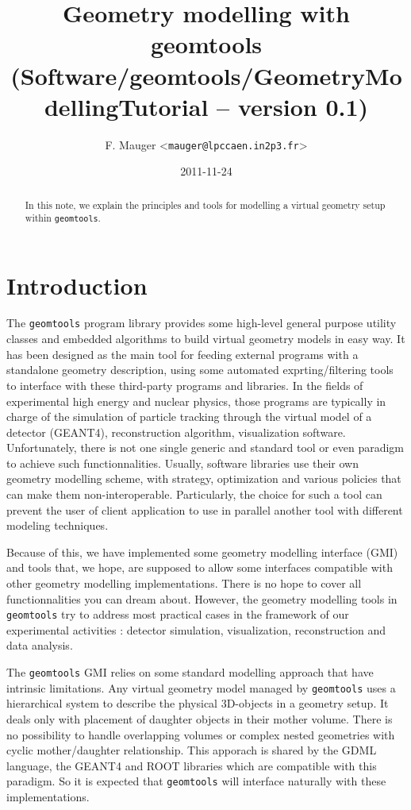 \documentclass[a4paper,12pt]{article}
\title{Geometry modelling with geomtools\\%
{\small{(Software/geomtools/GeometryModellingTutorial -- version 0.1)}}}
\author{F. Mauger <\texttt{mauger@lpccaen.in2p3.fr}>}
\date{2011-11-24}
\newcommand{\pn}{\par\noindent}
\begin{document}
\maketitle

\begin{abstract}
In this note, we explain the principles and tools
for modelling a virtual geometry setup within \texttt{geomtools}.
\end{abstract}

\section{Introduction}

\pn  The \texttt{geomtools} program  library provides  some high-level
general  purpose  utility classes  and  embedded  algorithms to  build
virtual geometry models in easy way.  It has been designed as the main
tool  for  feeding  external   programs  with  a  standalone  geometry
description,   using  some   automated  exprting/filtering   tools  to
interface with these third-party programs and libraries. In the fields
of experimental  high energy and  nuclear physics, those  programs are
typically in charge of the simulation of particle tracking through the
virtual  model  of  a  detector  (GEANT4),  reconstruction  algorithm,
visualization software. Unfortunately, there is not one single generic
and    standard   tool    or   even    paradigm   to    achieve   such
functionnalities. Usually,  software libraries use  their own geometry
modelling  scheme, with  strategy, optimization  and  various policies
that  can make  them non-interoperable.  Particularly, the  choice for
such  a tool  can prevent  the user  of client  application to  use in
parallel another tool with different modeling techniques.

\pn  Because of  this,  we have  implemented  some geometry  modelling
interface (GMI)  and tools that, we  hope, are supposed  to allow some
interfaces     compatible     with     other    geometry     modelling
implementations. There  is no hope  to cover all  functionnalities you
can   dream  about.    However,  the   geometry  modelling   tools  in
\texttt{geomtools}  try  to  address   most  practical  cases  in  the
framework  of  our  experimental  activities  :  detector  simulation,
visualization, reconstruction and data analysis.

\pn  The  \texttt{geomtools} GMI  relies  on  some standard  modelling
approach that  have intrinsic limitations. Any  virtual geometry model
managed by  \texttt{geomtools} uses a hierarchical  system to describe
the  physical 3D-objects  in  a  geometry setup.  It  deals only  with
placement  of daughter  objects in  their mother  volume. There  is no
possibility to handle overlapping volumes or complex nested geometries
with cyclic  mother/daughter relationship. This apporach  is shared by
the GDML language, the GEANT4  and ROOT libraries which are compatible
with this  paradigm.  So it  is expected that  \texttt{geomtools} will
interface naturally with these implementations.
\end{document}
